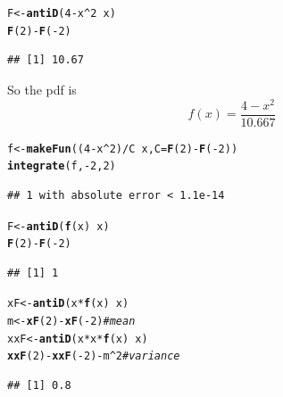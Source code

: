 \documentclass[twoside]{book}\usepackage[]{graphicx}\usepackage[]{xcolor}
\makeatletter
\newcommand{\hlnum}[1]{\textcolor[rgb]{0.686,0.059,0.569}{#1}}%
\newcommand{\hlcom}[1]{\textcolor[rgb]{0.678,0.584,0.686}{\textit{#1}}}%
\newcommand{\hlopt}[1]{\textcolor[rgb]{0,0,0}{#1}}%
\newcommand{\hlstd}[1]{\textcolor[rgb]{0.345,0.345,0.345}{#1}}%
\newcommand{\hlkwb}[1]{\textcolor[rgb]{0.69,0.353,0.396}{#1}}%
\newcommand{\hlkwc}[1]{\textcolor[rgb]{0.333,0.667,0.333}{#1}}%
\newcommand{\hlkwd}[1]{\textcolor[rgb]{0.737,0.353,0.396}{\textbf{#1}}}%
\newenvironment{kframe}{%
 \def\at@end@of@kframe{}%
 \ifinner\ifhmode%
  \def\at@end@of@kframe{\end{minipage}}%
  \begin{minipage}{\columnwidth}%
 \fi\fi%
 \def\FrameCommand##1{\hskip\@totalleftmargin \hskip-\fboxsep
 \colorbox{shadecolor}{##1}\hskip-\fboxsep
     \hskip-\linewidth \hskip-\@totalleftmargin \hskip\columnwidth}%
 \MakeFramed {\advance\hsize-\width
   \@totalleftmargin\z@ \linewidth\hsize
   \@setminipage}}%
 {\par\unskip\endMakeFramed%
 \at@end@of@kframe}
\newenvironment{knitrout}{}{} %
\makeatother
\begin{document}
\begin{solution}
\begin{knitrout}
\color{fgcolor}\begin{kframe}
\begin{alltt}
\hlstd{F} \hlkwb{<-} \hlkwd{antiD}\hlstd{(}\hlnum{4} \hlopt{-} \hlstd{x}\hlopt{^}\hlnum{2} \hlopt{~} \hlstd{x)}
\hlkwd{F}\hlstd{(}\hlnum{2}\hlstd{)} \hlopt{-} \hlkwd{F}\hlstd{(}\hlopt{-}\hlnum{2}\hlstd{)}
\end{alltt}
\begin{verbatim}
## [1] 10.67
\end{verbatim}
\end{kframe}
\end{knitrout}
	So the pdf is 
	\[
	f(x) = \frac{4 - x^2}{10.667}
	\]
\begin{knitrout}
\color{fgcolor}\begin{kframe}
\begin{alltt}
\hlstd{f} \hlkwb{<-} \hlkwd{makeFun}\hlstd{((}\hlnum{4} \hlopt{-} \hlstd{x}\hlopt{^}\hlnum{2}\hlstd{)} \hlopt{/} \hlstd{C} \hlopt{~} \hlstd{x,} \hlkwc{C} \hlstd{=} \hlkwd{F}\hlstd{(}\hlnum{2}\hlstd{)} \hlopt{-} \hlkwd{F}\hlstd{(}\hlopt{-}\hlnum{2}\hlstd{))}
\hlkwd{integrate}\hlstd{(f,} \hlopt{-}\hlnum{2}\hlstd{,} \hlnum{2}\hlstd{)}
\end{alltt}
\begin{verbatim}
## 1 with absolute error < 1.1e-14
\end{verbatim}
\begin{alltt}
\hlstd{F} \hlkwb{<-} \hlkwd{antiD}\hlstd{(}\hlkwd{f}\hlstd{(x)} \hlopt{~} \hlstd{x)}
\hlkwd{F}\hlstd{(}\hlnum{2}\hlstd{)} \hlopt{-} \hlkwd{F}\hlstd{(}\hlopt{-}\hlnum{2}\hlstd{)}
\end{alltt}
\begin{verbatim}
## [1] 1
\end{verbatim}
\begin{alltt}
\hlstd{xF} \hlkwb{<-} \hlkwd{antiD}\hlstd{(x}\hlopt{*}\hlkwd{f}\hlstd{(x)} \hlopt{~} \hlstd{x)}
\hlstd{m} \hlkwb{<-} \hlkwd{xF}\hlstd{(}\hlnum{2}\hlstd{)} \hlopt{-} \hlkwd{xF}\hlstd{(}\hlopt{-}\hlnum{2}\hlstd{)}           \hlcom{# mean}
\hlstd{xxF} \hlkwb{<-} \hlkwd{antiD}\hlstd{(x}\hlopt{*}\hlstd{x}\hlopt{*}\hlkwd{f}\hlstd{(x)} \hlopt{~} \hlstd{x)}
\hlkwd{xxF}\hlstd{(}\hlnum{2}\hlstd{)} \hlopt{-} \hlkwd{xxF}\hlstd{(}\hlopt{-}\hlnum{2}\hlstd{)} \hlopt{-} \hlstd{m}\hlopt{^}\hlnum{2}        \hlcom{# variance}
\end{alltt}
\begin{verbatim}
## [1] 0.8
\end{verbatim}
\end{kframe}
\end{knitrout}
\end{solution}
\end{document}
